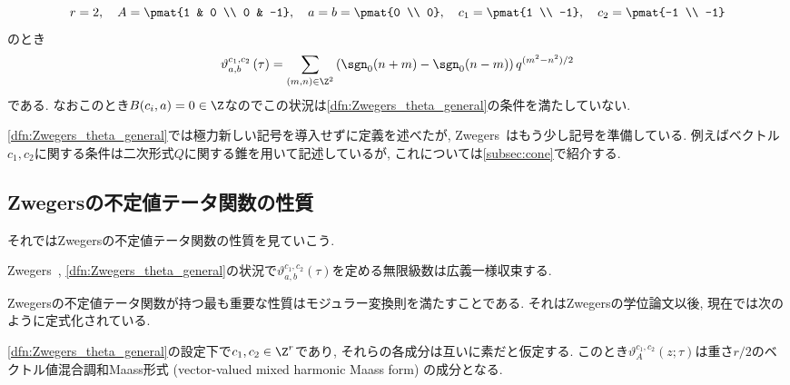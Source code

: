\documentclass[11pt,b5paper,oneside,lualatex]{ltjsarticle} %
\numberwithin{equation}{section} %
\begin{document}
\begin{ex}{}{}
	\[
	r = 2, \quad
	A = \pmat{1 & 0 \\ 0 & -1}, \quad
	a = b = \pmat{0 \\ 0}, \quad
	c_1= \pmat{1 \\ -1}, \quad
	c_2= \pmat{-1 \\ -1}
	\]
	のとき
	\[
	\vartheta_{a, b}^{c_1, c_2} \left( \tau \right)
	=
	\sum_{(m, n) \in \Z^2} \left( \sgn_0(n+m) - \sgn_0(n-m) \right) q^{(m^2 - n^2)/2}
	\]
	である. 
	なおこのとき$ B(c_i, a) = 0 \in \Z $なのでこの状況は\cref{dfn:Zwegers_theta_general}の条件を満たしていない. 
\end{ex}

\cref{dfn:Zwegers_theta_general}では極力新しい記号を導入せずに定義を述べたが, Zwegers~\cite{Zwegers_thesis}はもう少し記号を準備している. 
例えばベクトル$ c_1, c_2 $に関する条件は二次形式$ Q $に関する錐を用いて記述しているが, これについては\cref{subsec:cone}で紹介する. 


\subsection{Zwegersの不定値テータ関数の性質} \label{subsec:Zwegers_theta_property}


それではZwegersの不定値テータ関数の性質を見ていこう. 

\begin{thm}{{Zwegers~\cite[Proposition 2.4]{Zwegers_thesis}, \cite[Theorem 8.26]{BFOR}}}{}
	\cref{dfn:Zwegers_theta_general}の状況で$ \vartheta_{a, b}^{c_1, c_2} \left( \tau \right) $を定める無限級数は広義一様収束する. 
\end{thm}

Zwegersの不定値テータ関数が持つ最も重要な性質はモジュラー変換則を満たすことである. 
それはZwegersの学位論文以後, 現在では次のように定式化されている. 

\begin{thm}{{\cite[Theorem 8.30]{BFOR}}}{}
	\cref{dfn:Zwegers_theta_general}の設定下で$ c_1, c_2 \in \Z^r $であり, それらの各成分は互いに素だと仮定する. 
	このとき$ \vartheta_{A}^{c_1, c_2} \left( z; \tau \right) $は重さ$ r/2 $のベクトル値混合調和Maass形式 (vector-valued mixed harmonic Maass form) の成分となる. 
\end{thm}
\end{document}
